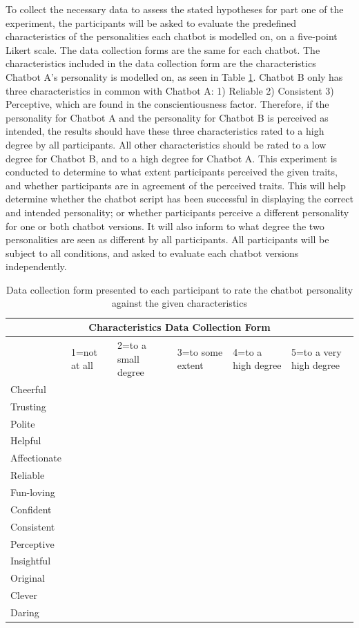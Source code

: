 To collect the necessary data to assess the stated hypotheses for part one of the experiment, the participants will be asked to evaluate the predefined characteristics of the personalities each chatbot is modelled on, on a five-point Likert scale. The data collection forms are the same for each chatbot. The characteristics included in the data collection form are the characteristics Chatbot A's personality is modelled on, as seen in Table \ref{tab:datacolchar}. Chatbot B only has three characteristics in common with Chatbot A: 1) Reliable 2) Consistent 3) Perceptive, which are found in the conscientiousness factor. Therefore, if the personality for Chatbot A and the personality for Chatbot B is perceived as intended, the results should have these three characteristics rated to a high degree by all participants. All other characteristics should be rated to a low degree for Chatbot B, and to a high degree for Chatbot A. This experiment is conducted to determine to what extent participants perceived the given traits, and whether participants are in agreement of the perceived traits. This will help determine whether the chatbot script has been successful in displaying the correct and intended personality; or whether participants perceive a different personality for one or both chatbot versions. It will also inform to what degree the two personalities are seen as different by all participants. All participants will be subject to all conditions, and asked to evaluate each chatbot versions independently. 

\vspace{2,5mm}

\begin{table}[H]
    \centering
\begin{tabular}{|p{2cm}|p{2cm}|p{2cm}|p{2cm}|p{2cm}|p{2cm}|}
 \hline
 \multicolumn{6}{|c|}{Characteristics Data Collection Form} \\
 \hline
& 1=not at all & 2=to a small degree & 3=to some extent & 4=to a high degree & 5=to a very high degree \\
\hline
Cheerful & & & & & \\
\hline
Trusting & & & & & \\
\hline
Polite & & & & & \\
\hline
Helpful & & & & & \\
\hline
Affectionate & & & & & \\
\hline
Reliable & & & & & \\
\hline
Fun-loving & & & & & \\
\hline
Confident & & & & & \\
\hline
Consistent & & & & & \\
\hline
Perceptive & & & & & \\
\hline
Insightful & & & & & \\
\hline
Original & & & & & \\
\hline
Clever & & & & & \\
\hline
Daring & & & & & \\
\hline
\end{tabular}
 \caption{Data collection form presented to each participant to rate the chatbot personality against the given characteristics}
    \label{tab:datacolchar}
\end{table}


